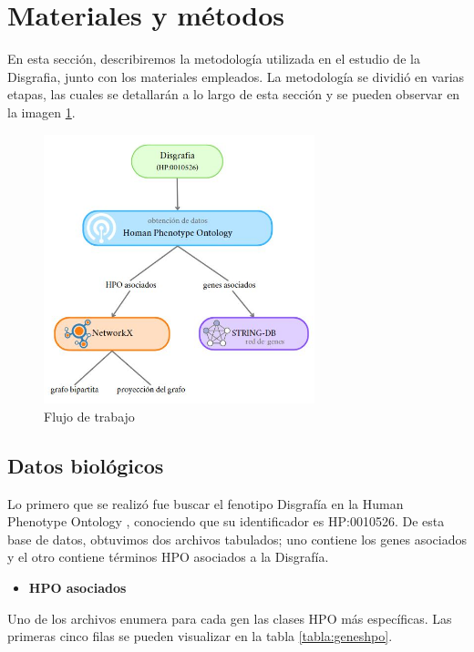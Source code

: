 \section{Materiales y métodos}

En esta sección, describiremos la metodología utilizada en el estudio de la Disgrafia,
junto con los materiales empleados. La metodología se dividió en varias etapas, las
cuales se detallarán a lo largo de esta sección y se pueden observar en la imagen \ref{fig:workflow}.

\begin{figure}[h!]
	\centering
	\includegraphics[width=0.7\textwidth]{figures/workflow.JPG}
	\caption{Flujo de trabajo}
	\label{fig:workflow}
\end{figure}

\subsection{Datos biológicos}

Lo primero que se realizó fue buscar el fenotipo Disgrafía en la Human Phenotype Ontology \cite{HPO2021}, conociendo que su identificador es HP:0010526. De esta base de datos, obtuvimos dos archivos tabulados; uno contiene los genes asociados y el otro contiene términos HPO asociados a la Disgrafía.

\begin{itemize}
	\item \textbf{HPO asociados}
\end{itemize}

Uno de los archivos enumera para cada gen las clases HPO más específicas. Las primeras cinco filas se pueden visualizar en la tabla \ref{tabla:geneshpo}.

